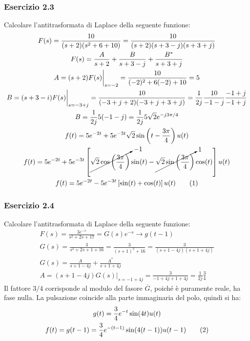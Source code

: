 \documentclass{article}
\newcommand{\tageq}{\tag{\stepcounter{equation}\theequation}}
\begin{document}
\subsubsection*{Esercizio 2.3}

Calcolare l'antitrasformata di Laplace della seguente funzione:
\begin{gather*}
    F(s)=\displaystyle\frac{10}{(s+2)(s^2+6+10)}=\frac{10}{(s+2)(s+3-j)(s+3+j)}\\
    F(s)=\displaystyle\frac{A}{s+2}+\frac{B}{s+3-j}+\frac{B^*}{s+3+j}\\
    A=(s+2)F(s)\bigg|_{s=-2}=\displaystyle\frac{10}{(-2)^2+6(-2)+10}=5\\
    B=(s+3-i)F(s)\bigg|_{s=-3+j}=\displaystyle\frac{10}{(-3+j+2)(-3+j+3+j)}=\frac{1}{2j}\frac{10}{-1-j}\frac{-1+j}{-1+j}\\
    B=\displaystyle\frac{1}{2j}5(-1-j)=\frac{1}{2j}5\sqrt{2}e^{-j3\pi/4}\\
    f(t)=5e^{-2t}+5e^{-3t}\sqrt2\sin\left(t-\frac{3\pi}{4}\right)u(t)\\
    f(t)=5e^{-2t}+5e^{-3t}\left[\cancelto{-1}{\sqrt{2}\cos\left(\frac{3\pi}{4}\right)}\sin(t)-\cancelto{1}{\sqrt2\sin\left(\frac{3\pi}{4}\right)}\cos(t)\right]u(t)\\
    f(t)=5e^{-2t}-5e^{-3t}\left[\sin(t)+\cos(t)\right]u(t)\tageq
\end{gather*}

\subsubsection*{Esercizio 2.4}
Calcolare l'antitrasformata di Laplace della seguente funzione:
\begin{gather*}
    F(s)=\displaystyle\frac{3e^{-s}}{s^2+2s+17}=G(s)e^{-s}\to g(t-1)\\
    G(s)=\displaystyle\frac{3}{s^2+2s+1+16}=\frac{3}{(s+1)^2+16}=\frac{3}{(s+1-4j)(s+1+4j)}\\
    G(s)=\displaystyle\frac{A}{s+1-4j}+\frac{A^*}{s+1+4j}\\
    A=(s+1-4j)G(s)\bigg|_{s=-1+4j}=\displaystyle\frac{3}{-1+4j+1+4j}=\frac{1}{2j}\frac{3}{4}
\end{gather*}
Il fattore $3/4$ corrisponde al modulo del fasore $\overline{G}$, poiché è puramente reale, ha fase nulla. La pulsazione coincide alla parte immaginaria del polo, quindi si ha:
\begin{gather*}
    g(t)=\frac{3}{4}e^{-t}\sin(4t)u(t)\\
    f(t)=g(t-1)=\displaystyle\frac{3}{4}e^{-(t-1)}\sin(4(t-1))u(t-1)\tageq
\end{gather*}
\end{document}
